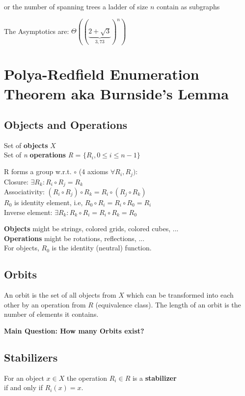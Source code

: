 \documentclass[12pt,onecolumn%
]{scrartcl}
\newcommand{\newsection}[1]{
\cleardoublepage
\section{#1}
}
\begin{document}
{or the number of spanning trees a ladder of size $n$ contain as subgraphs}

The Asymptotics are: $\Theta((\underbrace{2+\sqrt{3}}_{3,73})^n)$

\newsection{Polya-Redfield Enumeration Theorem
aka Burnside's Lemma}

\subsection{Objects and Operations}

Set of \textbf{objects} $X$ \\
Set of \textit{n} \textbf{operations} \textit{R} = $\{R_{i},0 \leq i \leq \textit{n} - 1 \}$

R forms a group w.r.t. $\circ$ (4 axioms $\forall R_{i}, R_{j}):$  \\
Closure: $\exists R_{k} : R_{i} \circ R_{j} = R_{k}$ \\
Associativity: $(R_{i} \circ R_{j}) \circ R_{k} = R_{i} \circ (R_{j} \circ R_{k}) $ \\
$R_0$ is identity element, i.e, $R_{0} \circ R_{i} = R_{i} \circ R_{0} = R_{i}$ \\
Inverse element: $\exists R_{k} : R_{k} \circ R_{i} = R_{i} \circ R_{k} = R_{0}$ 

\textbf{Objects} might be strings, colored grids, colored cubes, ... \\
\textbf{Operations} might be rotations, reflections, ... \\
For objects, $R_{0}$ is the identity (neutral) function.

\subsection{Orbits}
An orbit is the set of all objects from $X$ which can be
transformed into each other by an operation from $R$
(equivalence class).
The length of an orbit is the number of elements it
contains.
\begin{center}
\textbf{Main Question: How many Orbits exist?}
\end{center}

\subsection{Stabilizers}
For an object $x \in X$ the operation $R_{i} \in R$ is a \textbf{stabilizer} \\
if and only if $R_{i}(x) = x$.
\end{document}
